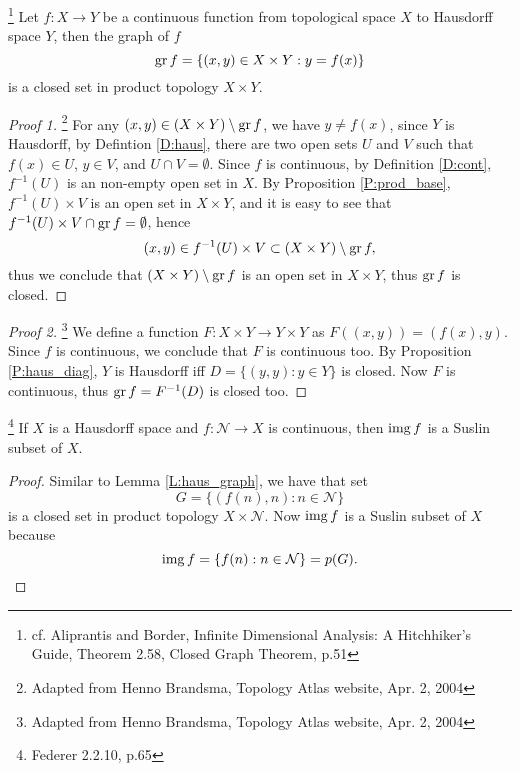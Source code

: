 \begin{lemma} \label{L:haus_graph}
\footnote{cf. Aliprantis and Border, Infinite Dimensional Analysis: A 
	  Hitchhiker's Guide, Theorem 2.58, Closed Graph Theorem, p.51}
Let $f:X\to Y$ be a continuous function from topological space $X$ to Hausdorff 
space $Y$, then the graph of $f$
\[
  \operatorname*{gr} f = \{ (x,y)\in X\times Y : y=f(x) \}
\]
is a closed set in product topology $X\times Y$.
\end{lemma}
\begin{proof}[Proof 1]
\footnote{Adapted from Henno Brandsma, Topology Atlas website, Apr. 2, 2004}
For any $(x,y)\in (X\times Y) \setminus \operatorname*{gr} f$, we have $y\neq f(x)$, since $Y$
is Hausdorff, by Defintion \ref{D:haus}, there are two open sets $U$ and
$V$ such that $f(x)\in U$, $y\in V$, and $U\cap V=\emptyset$.
Since $f$ is continuous, by Definition \ref{D:cont}, $f^{-1}(U)$ is an
non-empty open set in $X$. By Proposition \ref{P:prod_base}, $f^{-1}(U)\times V$
is an open set in $X\times Y$, and it is easy to see that 
$f^{-1}(U)\times V \cap \operatorname*{gr} f=\emptyset$, hence 
\[
  (x,y)\in f^{-1}(U)\times V \subset (X\times Y) \setminus \operatorname*{gr} f,
\]
thus we conclude that $(X\times Y) \setminus \operatorname*{gr} f$ is an open set in 
$X\times Y$, thus $\operatorname*{gr} f$ is closed.
\end{proof}
\begin{proof}[Proof 2]
	\footnote{Adapted from Henno Brandsma, Topology Atlas website, Apr. 2, 2004}
We define a function $F:X\times Y\to Y\times Y$ as $F((x,y))=(f(x),y)$. Since
$f$ is continuous, we conclude that $F$ is continuous too. By Proposition
\ref{P:haus_diag}, $Y$ is Hausdorff iff $D=\{ (y,y):y\in Y \}$ is closed. Now $F$
is continuous, thus $\operatorname*{gr} f=F^{-1}(D)$ is closed too.
\end{proof}

\begin{proposition} \label{P:suslin_haus}
  \footnote{Federer 2.2.10, p.65}
	If $X$ is a Hausdorff space and $f:\mathcal{N}\to X$ is continuous, then
	$\operatorname*{img} f$ is a Suslin subset of $X$.
\end{proposition}
\begin{proof}
Similar to Lemma \ref{L:haus_graph}, we have that set
\[
	G = \{ (f(n),n): n\in\mathcal{N} \}
\]
is a closed set in product topology $X\times \mathcal{N}$. Now $\operatorname*{img} f$ is a
Suslin subset of $X$ because
\[
	\operatorname*{img} f = \{ f(n): n\in \mathcal{N} \} = p(G).
\]
\end{proof}


